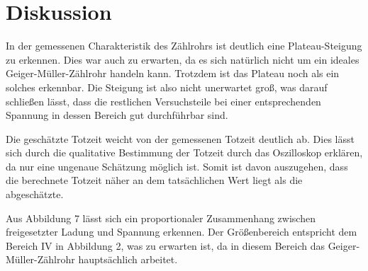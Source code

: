 \section{Diskussion}
\label{sec:Diskussion}

In der gemessenen Charakteristik des Zählrohrs ist deutlich eine Plateau-Steigung zu erkennen. Dies war auch zu
erwarten, da es sich natürlich nicht um ein ideales Geiger-Müller-Zählrohr handeln kann. Trotzdem ist das Plateau
noch als ein solches erkennbar. Die Steigung ist also nicht unerwartet groß, was darauf schließen lässt, dass die
restlichen Versuchsteile bei einer entsprechenden Spannung in dessen Bereich gut durchführbar sind.

Die geschätzte Totzeit weicht von der gemessenen Totzeit deutlich ab. Dies lässt sich durch die qualitative
Bestimmung der Totzeit durch das Oszilloskop erklären, da nur eine ungenaue Schätzung möglich ist. Somit ist
davon auszugehen, dass die berechnete Totzeit näher an dem tatsächlichen Wert liegt als die abgeschätzte.


Aus Abbildung 7 lässt sich ein proportionaler Zusammenhang zwischen freigesetzter Ladung und Spannung erkennen. Der Größenbereich entspricht
dem Bereich IV in Abbildung 2, was zu erwarten ist, da in diesem Bereich das Geiger-Müller-Zählrohr hauptsächlich arbeitet.
